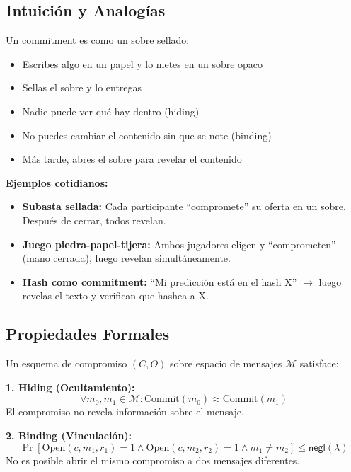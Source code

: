 \documentclass[11pt,a4paper,twoside]{book}
\newcommand{\negl}{\textsf{negl}}
\begin{document}
\subsection{Intuici\'on y Analog\'ias}

\begin{intuicion}
Un commitment es como un sobre sellado:
\begin{itemize}
    \item Escribes algo en un papel y lo metes en un sobre opaco
    \item Sellas el sobre y lo entregas
    \item Nadie puede ver qu\'e hay dentro (hiding)
    \item No puedes cambiar el contenido sin que se note (binding)
    \item M\'as tarde, abres el sobre para revelar el contenido
\end{itemize}

\textbf{Ejemplos cotidianos:}
\begin{itemize}
    \item \textbf{Subasta sellada:} Cada participante ``compromete'' su oferta en un sobre. Despu\'es de cerrar, todos revelan.
    \item \textbf{Juego piedra-papel-tijera:} Ambos jugadores eligen y ``comprometen'' (mano cerrada), luego revelan simult\'aneamente.
    \item \textbf{Hash como commitment:} ``Mi predicci\'on est\'a en el hash X'' $\to$ luego revelas el texto y verifican que hashea a X.
\end{itemize}
\end{intuicion}

\subsection{Propiedades Formales}

\begin{definition}
Un esquema de compromiso $(C, O)$ sobre espacio de mensajes $\mathcal{M}$ satisface:

\textbf{1. Hiding (Ocultamiento):}
\[ \forall m_0, m_1 \in \mathcal{M}: \text{Commit}(m_0) \approx \text{Commit}(m_1) \]
El compromiso no revela informaci\'on sobre el mensaje.

\textbf{2. Binding (Vinculaci\'on):}
\[ \Pr[\text{Open}(c, m_1, r_1) = 1 \land \text{Open}(c, m_2, r_2) = 1 \land m_1 \neq m_2] \leq \negl(\lambda) \]
No es posible abrir el mismo compromiso a dos mensajes diferentes.
\end{definition}
\end{document}
